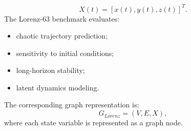 \begin{equation} X(t) = [x(t),y(t),z(t)]^T . \end{equation} The Lorenz-63 benchmark evaluates: \begin{itemize} \item chaotic trajectory prediction; \item sensitivity to initial conditions; \item long-horizon stability; \item latent dynamics modeling. \end{itemize} The corresponding graph representation is: \begin{equation} G_{Lorenz} = (V,E,X), \end{equation} where each state variable is represented as a graph node. %